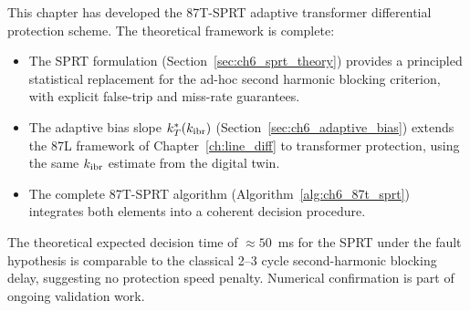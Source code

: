 This chapter has developed the 87T-SPRT adaptive transformer differential
protection scheme. The theoretical framework is complete:

\begin{itemize}
\item The SPRT formulation (Section~\ref{sec:ch6_sprt_theory}) provides
      a principled statistical replacement for the ad-hoc second harmonic
      blocking criterion, with explicit false-trip and miss-rate guarantees.
\item The adaptive bias slope $k_T^*(k_\mathrm{ibr})$ (Section~\ref{sec:ch6_adaptive_bias})
      extends the 87L framework of Chapter~\ref{ch:line_diff} to transformer
      protection, using the same $k_\mathrm{ibr}$ estimate from the digital twin.
\item The complete 87T-SPRT algorithm (Algorithm~\ref{alg:ch6_87t_sprt})
      integrates both elements into a coherent decision procedure.
\end{itemize}

The theoretical expected decision time of $\approx 50$~ms for the SPRT
under the fault hypothesis is comparable to the classical 2--3 cycle
second-harmonic blocking delay, suggesting no protection speed penalty.
Numerical confirmation is part of ongoing validation work.
